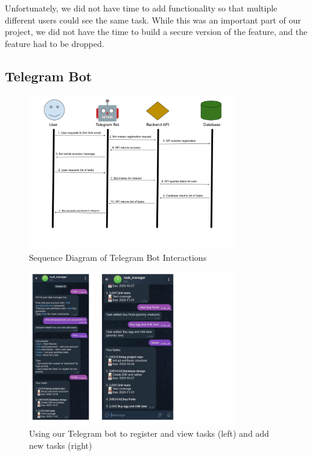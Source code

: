\documentclass[11pt,oneside]{article}
\begin{document}
Unfortunately, we did not have time to add functionality so that multiple different users could see the same task. While this was an important part of our project, we did not have the time to build a secure version of the feature, and the feature had to be dropped.

\subsection{Telegram Bot}

\begin{figure}[H]
    \centering
    \includegraphics[width=0.8\textwidth]{telegram_bot.png}
    \caption{Sequence Diagram of Telegram Bot Interactions}
    \label{fig:telegram-diagram}
\end{figure}

\begin{figure}[H]
    \centering
    \includegraphics[width=0.8\textwidth]{telegram_example.png}
    \caption{Using our Telegram bot to register and view tasks (left) and add new tasks (right)}
    \label{fig:telegram-example}
\end{figure}
\end{document}
